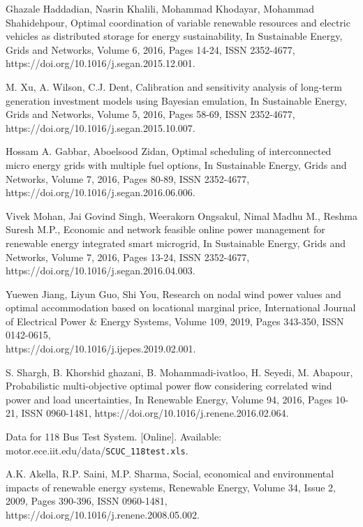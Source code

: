 \begin{thebibliography}{99}
\begin{singlespace}
Ghazale Haddadian, Nasrin Khalili, Mohammad Khodayar, Mohammad Shahidehpour, Optimal coordination of variable renewable resources and electric vehicles as distributed storage for energy sustainability, In Sustainable Energy, Grids and Networks, Volume 6, 2016, Pages 14-24, ISSN 2352-4677, https://doi.org/10.1016/j.segan.2015.12.001.

M. Xu, A. Wilson, C.J. Dent, Calibration and sensitivity analysis of long-term generation investment models using Bayesian emulation, In Sustainable Energy, Grids and Networks, Volume 5, 2016, Pages 58-69, ISSN 2352-4677, https://doi.org/10.1016/j.segan.2015.10.007.

Hossam A. Gabbar, Aboelsood Zidan, Optimal scheduling of interconnected micro energy grids with multiple fuel options, In Sustainable Energy, Grids and Networks, Volume 7, 2016, Pages 80-89, ISSN 2352-4677, https://doi.org/10.1016/j.segan.2016.06.006.

Vivek Mohan, Jai Govind Singh, Weerakorn Ongsakul, Nimal Madhu M., Reshma Suresh M.P., Economic and network feasible online power management for renewable energy integrated smart microgrid, In Sustainable Energy, Grids and Networks, Volume 7, 2016, Pages 13-24, ISSN 2352-4677, https://doi.org/10.1016/j.segan.2016.04.003.

 Yuewen Jiang, Liyun Guo, Shi You, Research on nodal wind power values and optimal accommodation based on locational marginal price, International Journal of Electrical Power \& Energy Systems, Volume 109, 2019, Pages 343-350, ISSN 0142-0615, \\ https://doi.org/10.1016/j.ijepes.2019.02.001.

S. Shargh, B. Khorshid ghazani, B. Mohammadi-ivatloo, H. Seyedi, M. Abapour, Probabilistic multi-objective optimal power flow considering correlated wind power and load uncertainties, In Renewable Energy, Volume 94, 2016, Pages 10-21, ISSN 0960-1481, https://doi.org/10.1016/j.renene.2016.02.064.

 Data for 118 Bus Test System. [Online]. Available: motor.ece.iit.edu/data/\verb|SCUC_118test.xls|.

 A.K. Akella, R.P. Saini, M.P. Sharma, Social, economical and environmental impacts of renewable energy systems, Renewable Energy, Volume 34, Issue 2, 2009, Pages 390-396, ISSN 0960-1481, https://doi.org/10.1016/j.renene.2008.05.002.


\end{singlespace}
\end{thebibliography}
